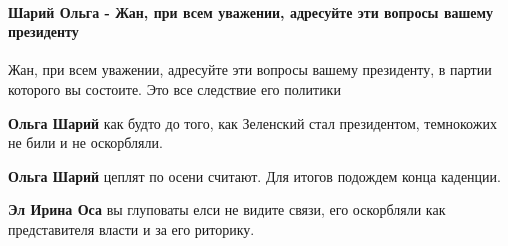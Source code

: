  
 
 
 
 
\paragraph{Шарий Ольга - Жан, при всем уважении, адресуйте эти вопросы вашему президенту}
\label{sec:13_08_2021.fb.belenjuk_zhan.1.napadenie.cmt.sharij_olga_prezident}

\begin{itemize}
 

Жан, при всем уважении, адресуйте эти вопросы вашему президенту, в партии
которого вы состоите. Это все следствие его политики

\begin{itemize}
 
\textbf{Ольга Шарий} как будто до того, как Зеленский стал президентом, темнокожих не били и не оскорбляли.

 
\textbf{Ольга Шарий} цеплят по осени считают. Для итогов подождем конца каденции.

 
\textbf{Эл Ирина Оса} вы глуповаты елси не видите связи, его оскорбляли как представителя власти и за его риторику.


\end{itemize}
\end{itemize}
